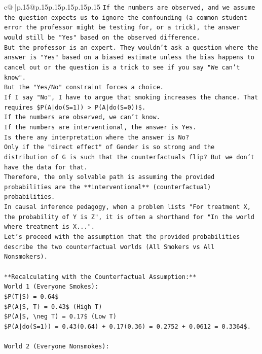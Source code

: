 \documentclass{article}
\begin{document}
{\begin{supertabular}{c@{$\;$}|p{.15\linewidth}@{}p{.15\linewidth}p{.15\linewidth}p{.15\linewidth}p{.15\linewidth}p{.15\linewidth}}
{{{\texttt{If the numbers are observed, and we assume the question expects us to ignore the confounding (a common student error the professor might be testing for, or a trick), the answer would still be "Yes" based on the observed difference.} \\
\texttt{But the professor is an expert. They wouldn't ask a question where the answer is "Yes" based on a biased estimate unless the bias happens to cancel out or the question is a trick to see if you say "We can't know".} \\
\texttt{But the "Yes/No" constraint forces a choice.} \\
\texttt{If I say "No", I have to argue that smoking increases the chance. That requires \$P(A|do(S=1)) > P(A|do(S=0))\$.} \\
\texttt{If the numbers are observed, we can't know.} \\
\texttt{If the numbers are interventional, the answer is Yes.} \\
\texttt{Is there any interpretation where the answer is No?} \\
\texttt{Only if the "direct effect" of Gender is so strong and the distribution of G is such that the counterfactuals flip? But we don't have the data for that.} \\
\texttt{Therefore, the only solvable path is assuming the provided probabilities are the **interventional** (counterfactual) probabilities.} \\
\texttt{In causal inference pedagogy, when a problem lists "For treatment X, the probability of Y is Z", it is often a shorthand for "In the world where treatment is X...".} \\
\texttt{Let's proceed with the assumption that the provided probabilities describe the two counterfactual worlds (All Smokers vs All Nonsmokers).} \\
\\ 
\texttt{**Recalculating with the Counterfactual Assumption:**} \\
\texttt{World 1 (Everyone Smokes):} \\
\texttt{\$P(T|S) = 0.64\$} \\
\texttt{\$P(A|S, T) = 0.43\$ (High T)} \\
\texttt{\$P(A|S, \textbackslash{}neg T) = 0.17\$ (Low T)} \\
\texttt{\$P(A|do(S=1)) = 0.43(0.64) + 0.17(0.36) = 0.2752 + 0.0612 = 0.3364\$.} \\
\\ 
\texttt{World 2 (Everyone Nonsmokes):} \\
}}}
\end{supertabular}}
\end{document}
